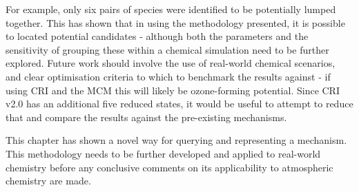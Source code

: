 For example, only six pairs of species were identified to be potentially lumped together. This has shown that in using the methodology presented, it is possible to located potential candidates -  although both the parameters and the sensitivity of grouping these within a chemical simulation need to be further explored. Future work should involve the use of real-world chemical scenarios, and clear optimisation criteria to which to benchmark the results against - if using CRI and the MCM this will likely be ozone-forming potential. Since CRI v2.0 has an additional five reduced states, it would be useful to attempt to reduce that and compare the results against the pre-existing mechanisms.

This chapter has shown a novel way for querying and representing a mechanism. This methodology needs to be further developed and applied to real-world chemistry before any conclusive comments on its applicability to atmospheric chemistry are made.
